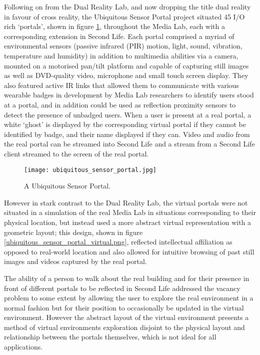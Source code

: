 Following on from the Dual Reality Lab, and now dropping the title dual reality in favour of cross reality, the Ubiquitous Sensor Portal project situated 45 I/O rich `portals', shown in figure \ref{ubiquitous_sensor_portal.jpg}, throughout the Media Lab, each with a corresponding extension in Second Life. Each portal comprised a myriad of environmental sensors (passive infrared (PIR) motion, light, sound, vibration, temperature and humidity) in addition to multimedia abilities via a camera, mounted on a motorised pan/tilt platform and capable of capturing still images as well as DVD-quality video, microphone and small touch screen display. They also featured active IR links that allowed them to communicate with various wearable badges in development by Media Lab researchers to identify users stood at a portal, and in addition could be used as reflection proximity sensors to detect the presence of unbadged users. When a user is present at a real portal, a white `ghost' is displayed by the corresponding virtual portal if they cannot be identified by badge, and their name displayed if they can. Video and audio from the real portal can be streamed into Second Life and a stream from a Second Life client streamed to the screen of the real portal.

\begin{figure}[h]
\centering
\texttt{[image: ubiquitous\_sensor\_portal.jpg]}
\caption{A Ubiquitous Sensor Portal.}
\label{ubiquitous_sensor_portal.jpg}
\end{figure}

However in stark contrast to the Dual Reality Lab, the virtual portals were not situated in a simulation of the real Media Lab in situations corresponding to their physical location, but instead used a more abstract virtual representation with a geometric layout; this design, shown in figure \ref{ubiquitous_sensor_portal_virtual.png}, reflected intellectual affiliation as opposed to real-world location and also allowed for intuitive browsing of past still images and videos captured by the real portal.

The ability of a person to walk about the real building and for their presence in front of different portals to be reflected in Second Life addressed the vacancy problem to some extent by allowing the user to explore the real environment in a normal fashion but for their position to occasionally be updated in the virtual environment. However the abstract layout of the virtual environment presents a method of virtual environments exploration disjoint to the physical layout and relationship between the portals themselves, which is not ideal for all applications.

